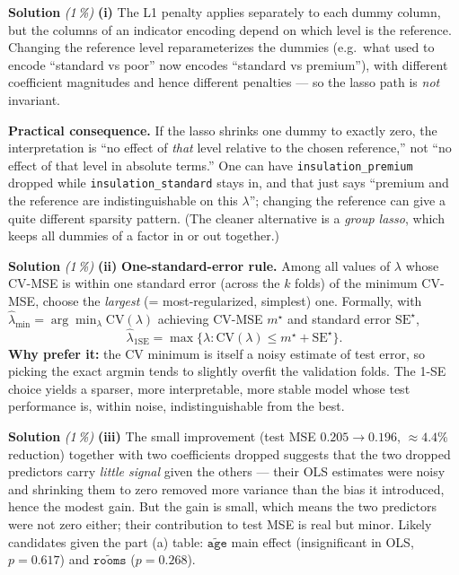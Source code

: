 \documentclass[11pt,a4paper]{article}
\newcommand{\subpoints}[1]{\textit{(#1\,\%)}}
\newcommand{\sol}{\noindent\textbf{Solution}}
\begin{document}
\sol{} \subpoints{1} \textbf{(i)} The L1 penalty applies separately to each dummy column, but the
columns of an indicator encoding depend on which level is the reference. Changing the reference
level reparameterizes the dummies (e.g.\ what used to encode ``standard vs poor'' now encodes
``standard vs premium''), with different coefficient magnitudes and hence different penalties ---
so the lasso path is \emph{not} invariant.

\textbf{Practical consequence.} If the lasso shrinks one dummy to exactly zero, the interpretation
is ``no effect of \emph{that} level relative to the chosen reference,'' not ``no effect of that
level in absolute terms.'' One can have \texttt{insulation\_premium} dropped while
\texttt{insulation\_standard} stays in, and that just says ``premium and the reference are
indistinguishable on this $\lambda$''; changing the reference can give a quite different sparsity
pattern. (The cleaner alternative is a \emph{group lasso}, which keeps all dummies of a factor
in or out together.)

\medskip
\sol{} \subpoints{1} \textbf{(ii)} \textbf{One-standard-error rule.} Among all values of $\lambda$
whose CV-MSE is within one standard error (across the $k$ folds) of the minimum CV-MSE, choose
the \emph{largest} (= most-regularized, simplest) one. Formally, with
$\hat\lambda_{\min}=\arg\min_\lambda\mathrm{CV}(\lambda)$ achieving CV-MSE $m^\star$ and standard
error $\mathrm{SE}^\star$,
$$\hat\lambda_{1\mathrm{SE}} = \max\bigl\{\lambda:\mathrm{CV}(\lambda)\leq m^\star+\mathrm{SE}^\star\bigr\}.$$
\textbf{Why prefer it:} the CV minimum is itself a noisy estimate of test error, so picking the
exact argmin tends to slightly overfit the validation folds. The 1-SE choice yields a sparser,
more interpretable, more stable model whose test performance is, within noise, indistinguishable
from the best.

\medskip
\sol{} \subpoints{1} \textbf{(iii)} The small improvement (test MSE $0.205 \to 0.196$, $\approx 4.4\%$
reduction) together with two coefficients dropped suggests that the two dropped predictors carry
\emph{little signal} given the others --- their OLS estimates were noisy and shrinking them to
zero removed more variance than the bias it introduced, hence the modest gain. But the gain is
small, which means the two predictors were not zero either; their contribution to test MSE is
real but minor. Likely candidates given the part (a) table: $\widetilde{\texttt{age}}$ main
effect (insignificant in OLS, $p=0.617$) and $\widetilde{\texttt{rooms}}$ ($p=0.268$).
\end{document}
